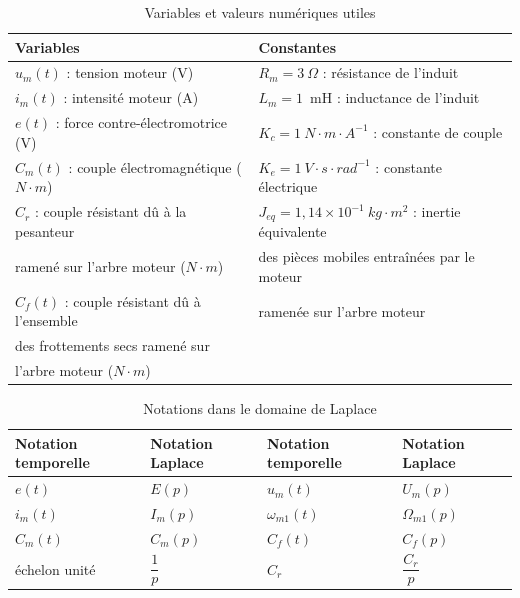 \begin{table}[!ht!]
\renewcommand{\arraystretch}{1.3}
\begin{tabular}{|p{7.5cm}|p{8.5cm}|}
  \hline
  \textbf{Variables} & \textbf{Constantes} \\
  \hline
  $u_m(t)$ : tension moteur (V) & $R_m = 3\ \Omega$ : résistance de l'induit \\
  $i_m(t)$ : intensité moteur (A) & $L_m = 1$~mH : inductance de l'induit \\
  $e(t)$ : force contre-électromotrice (V) & $K_c = 1~N\cdot m\cdot A^{-1}$ : constante de couple \\
  $C_m(t)$ : couple électromagnétique ($N\cdot m$) & $K_e = 1~V\cdot s\cdot rad^{-1}$ : constante électrique \\
  $C_r$ : couple résistant dû à la pesanteur & $J_{eq} = 1,14 \times 10^{-1}~kg\cdot m^2$ : inertie équivalente \\
  ramené sur l'arbre moteur ($N\cdot m$) & des pièces mobiles entraînées par le moteur \\
  $C_f(t)$ : couple résistant dû à l'ensemble & ramenée sur l'arbre moteur \\
  des frottements secs ramené sur & \\
  l'arbre moteur ($N\cdot m$) & \\
  \hline
\end{tabular}
\caption{\label{tab05}Variables et valeurs numériques utiles}
\end{table}

\medskip

\begin{table}[!ht]
\renewcommand{\arraystretch}{1.3}
\begin{tabular}{|p{4cm}p{3.5cm}|p{4cm}p{3.5cm}|}
  \hline
  \textbf{Notation temporelle} & \textbf{Notation Laplace} & \textbf{Notation temporelle} & \textbf{Notation Laplace} \\
  \hline
  $e(t)$ & $E(p)$ & $u_m(t)$ & $U_m(p)$ \\
  $i_m(t)$ & $I_m(p)$ & $\omega_{m1}(t)$ & $\Omega_{m1}(p)$ \\
  $C_m(t)$ & $C_m(p)$ & $C_f(t)$ & $C_f(p)$ \\
  échelon unité & $\dfrac{1}{p}$ & $C_r$ & $\dfrac{C_r}{p}$ \\
  \hline
\end{tabular}
\caption{\label{tab06}Notations dans le domaine de Laplace}
\end{table}

\medskip

